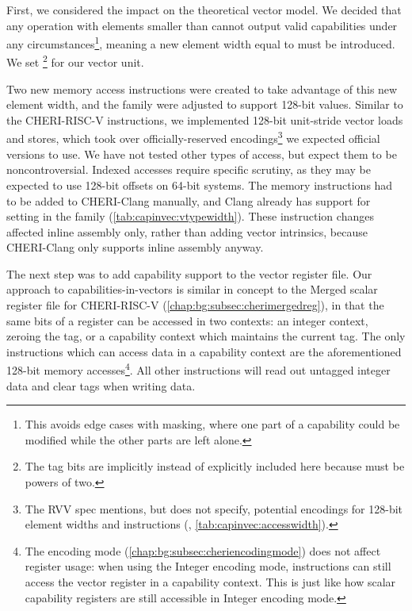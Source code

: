 \documentclass[../thesis]{subfiles}
\begin{document}
First, we considered the impact on the theoretical vector model.
We decided that any operation with elements smaller than  cannot output valid capabilities under any circumstances\footnote{This avoids edge cases with masking, where one part of a capability could be modified while the other parts are left alone.}, meaning a new element width equal to  must be introduced.
We set \footnote{The tag bits are implicitly instead of explicitly included here because  must be powers of two.} for our vector unit.

Two new memory access instructions were created to take advantage of this new element width, and the  family were adjusted to support 128-bit values.
Similar to the CHERI-RISC-V  instructions, we implemented 128-bit unit-stride vector loads and stores, which took over officially-reserved encodings\footnote{The RVV spec mentions, but does not specify, potential encodings for 128-bit element widths and instructions (\cite[p10, p32]{specification-RVV-v1.0}, \cref{tab:capinvec:accesswidth}).} we expected official versions to use.
We have not tested other types of access, but expect them to be noncontroversial.
Indexed accesses require specific scrutiny, as they may be expected to use 128-bit offsets on 64-bit systems.
The memory instructions had to be added to CHERI-Clang manually, and Clang already has support for setting  in the  family (\cref{tab:capinvec:vtypewidth}).
These instruction changes affected inline assembly only, rather than adding vector intrinsics, because CHERI-Clang only supports inline assembly anyway.

% 

The next step was to add capability support to the vector register file.
Our approach to capabilities-in-vectors is similar in concept to the Merged scalar register file for CHERI-RISC-V (\cref{chap:bg:subsec:cherimergedreg}), in that the same bits of a register can be accessed in two contexts: an integer context, zeroing the tag, or a capability context which maintains the current tag.
The only instructions which can access data in a capability context are the aforementioned 128-bit memory accesses\footnote{The encoding mode (\cref{chap:bg:subsec:cheriencodingmode}) does not affect register usage: when using the Integer encoding mode, instructions can still access the vector register in a capability context. This is just like how scalar capability registers are still accessible in Integer encoding mode.}.
All other instructions will read out untagged integer data and clear tags when writing data.
\end{document}
